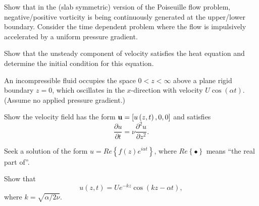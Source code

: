 \documentclass[10pt]{report}
\begin{document}
\begin{question}
	Show that in the (slab symmetric) version of the Poiseuille flow problem,
	negative/positive vorticity is being continuously generated at the upper/lower boundary.
	Consider the time dependent problem where the flow is impulsively accelerated by a uniform pressure gradient.

	Show that the unsteady component of velocity satisfies the heat equation and
	determine the initial condition for this equation.
\label{qn:starting-couette-flow}
\end{question}

\begin{questionstar}
	 An incompressible fluid occupies the space $0<z<\infty $ above a plane
	rigid boundary $z = 0$, which oscillates in the $x$-direction with
	velocity $U\cos \left( {\alpha t} \right)$. (Assume no applied pressure gradient.)

	Show the velocity field has the form ${\rm
	{\bf u}}=\left[ {u\left( {z,t} \right),0,0} \right]$ and satisfies
	\[ \frac{\partial u}{\partial t}=\nu \frac{\partial ^2u}{\partial z^2}. \]

	 Seek a solution of the form $u=Re\left\{ {f\left( z \right)e^{i\alpha t}}
	\right\}$, where $Re\left\{ \bullet \right\}$ means ``the real part of''.

	Show that \[ u(z,t)=Ue^{-kz}\cos \left( {kz-\alpha t} \right), \]
	 where $k=\sqrt{\alpha / {2\nu }} $.
\label{qn:oscillating-half-plane}
\end{questionstar}
\end{document}
